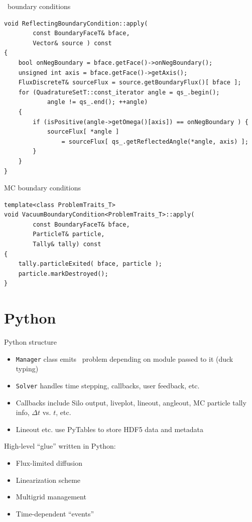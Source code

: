 \documentclass{beamer}
\begin{document}
\begin{frame}[fragile]{\SN\ boundary conditions}
  \begin{verbatim}
void ReflectingBoundaryCondition::apply(
        const BoundaryFaceT& bface,
        Vector& source ) const
{
    bool onNegBoundary = bface.getFace()->onNegBoundary();
    unsigned int axis = bface.getFace()->getAxis();
    FluxDiscreteT& sourceFlux = source.getBoundaryFlux()[ bface ];
    for (QuadratureSetT::const_iterator angle = qs_.begin();
            angle != qs_.end(); ++angle)
    {
        if (isPositive(angle->getOmega()[axis]) == onNegBoundary ) {
            sourceFlux[ *angle ]
                = sourceFlux[ qs_.getReflectedAngle(*angle, axis) ];
        }
    }
}
  \end{verbatim}
\end{frame}

\begin{frame}[fragile]{MC boundary conditions}
  \begin{verbatim}
template<class ProblemTraits_T>
void VacuumBoundaryCondition<ProblemTraits_T>::apply(
        const BoundaryFaceT& bface,
        ParticleT& particle,
        Tally& tally) const
{
    tally.particleExited( bface, particle );
    particle.markDestroyed();
}
  \end{verbatim}
\end{frame}

\section{Python}
\begin{frame}[fragile]{Python structure}
  \begin{itemize}
    \item \verb|Manager| class emits \cpp\ problem depending on module passed
      to it (duck typing)
    \item \verb|Solver| handles time stepping, callbacks, user feedback, etc.
    \item Callbacks include Silo output, liveplot, lineout, angleout, MC
      particle tally info, $\Delta t$ vs. $t$, etc.
    \item Lineout etc. use PyTables to store HDF5 data and metadata
  \end{itemize}

  High-level ``glue'' written in Python:
  \begin{itemize}
    \item Flux-limited diffusion
    \item Linearization scheme
    \item Multigrid management
    \item Time-dependent ``events''
  \end{itemize}
\end{frame}
\end{document}
